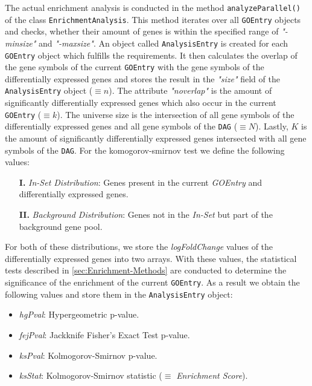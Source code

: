 \documentclass[12pt]{article}
\begin{document}
The actual enrichment analysis is conducted in the method \texttt{analyzeParallel()} of the
class \texttt{EnrichmentAnalysis}. This method iterates over all \texttt{GOEntry} objects
and checks, whether their amount of genes is within the specified range of \textit{"-minsize"}
and \textit{"-maxsize"}. 
An object called \texttt{AnalysisEntry} is created for each \texttt{GOEntry} object which
fulfills the requirements.
It then calculates the overlap of the gene symbols of the current \texttt{GOEntry} with 
the gene symbols of the differentially expressed genes and stores the result 
in the \textit{"size"} field of the \texttt{AnalysisEntry} object ($\equiv n$).
The attribute \textit{"noverlap"} is the amount of significantly differentially expressed genes
which also occur in the current \texttt{GOEntry} ($\equiv k$). 
The universe size is the intersection of all gene symbols of the differentially expressed genes
and all gene symbols of the \texttt{DAG} ($\equiv N$). Lastly, $K$ is the amount of significantly
differentially expressed genes intersected with all gene symbols of the \texttt{DAG}.
For the komogorov-smirnov test we define the following values:
\begin{itemize}
    \item[\textbf{I.}] \textit{In-Set Distribution}: Genes present in the current \textit{GOEntry} and differentially expressed genes.
    \item[\textbf{II.}] \textit{Background Distribution}: Genes not in the \textit{In-Set} but part of the background gene pool.
\end{itemize}
For both of these distributions, we store the \textit{logFoldChange} values of the differentially
expressed genes into two arrays.
With these values, the statistical tests described in \ref{sec:Enrichment-Methods} are 
conducted to determine the significance of the enrichment of the current \texttt{GOEntry}. 
As a result we obtain the following values and store them in the \texttt{AnalysisEntry} object:
\begin{itemize}
    \item \textit{hgPval}: Hypergeometric p-value.
    \item \textit{fejPval}: Jackknife Fisher's Exact Test p-value.
    \item \textit{ksPval}: Kolmogorov-Smirnov p-value.
    \item \textit{ksStat}: Kolmogorov-Smirnov statistic ($\equiv$ \textit{Enrichment Score}).
\end{itemize}
\hspace{1mm}\\
\end{document}
